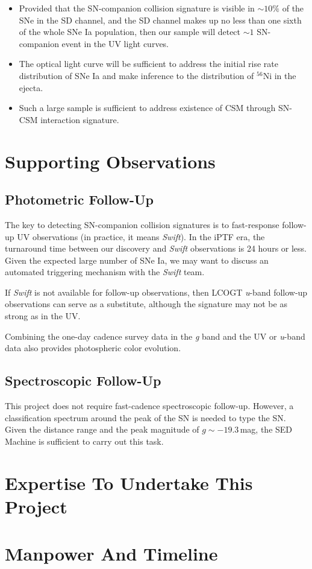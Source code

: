 \documentclass[11pt]{article}
\begin{document}
\begin{itemize}
\item Provided that the SN-companion collision signature is visible in
  $\sim 10\%$ of the SNe in the SD channel, and the SD channel makes up
  no less than one sixth of the whole SNe Ia population, then our sample
  will detect $\sim 1$ SN-companion event in the UV light curves.
\item The optical light curve will be sufficient to address the initial
  rise rate distribution of SNe Ia and make inference to the distribution
  of $^{56}$Ni in the ejecta.
\item Such a large sample is sufficient to address existence of CSM
  through SN-CSM interaction signature.
\end{itemize}


\section{Supporting Observations}
\label{sec:supporting_observations}

\subsection{Photometric Follow-Up}
\label{sec:photometric_follow_up}

The key to detecting SN-companion collision signatures is to
fast-response follow-up UV observations (in practice, it means
\textit{Swift}). In the iPTF era, the turnaround time between our
discovery and \textit{Swift} observations is 24 hours or less.
Given the expected large number of SNe Ia, we may want to discuss
an automated triggering mechanism with the \textit{Swift} team.

If \textit{Swift} is not available for follow-up observations, then
LCOGT \textit{u}-band follow-up observations can serve as a
substitute, although the signature may not be as strong as in the UV.

Combining the one-day cadence survey data in the \textit{g} band and
the UV or \textit{u}-band data also provides photospheric color
evolution.

\subsection{Spectroscopic Follow-Up}
\label{sec:spectroscopic_follow_up}

This project does not require fast-cadence spectroscopic follow-up.
However, a classification spectrum around the peak of the SN is needed
to type the SN. Given the distance range and the peak magnitude of
$g\sim-19.3$\,mag, the SED Machine is sufficient to carry out this
task.


\section{Expertise To Undertake This Project}
\label{sec:expertise_to_undertake_this_project}


\section{Manpower And Timeline}
\label{sec:manpower_and_timeline}






\end{document}
